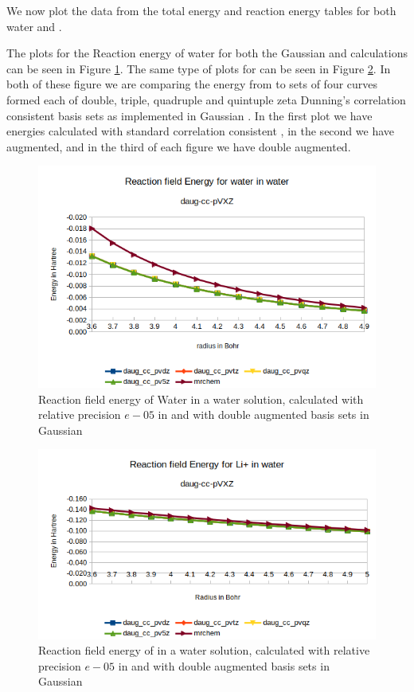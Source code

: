 \documentclass[../master_thesis.tex]{subfiles}
\begin{document}
We now plot the data from the total energy and reaction energy tables for
both water and .

The plots for the Reaction energy of water for
both the Gaussian and  \mrchem calculations can be seen in Figure \ref{fig:watEnergyplotsdaug}.
The same type of plots for  can be seen in Figure \ref{fig:lipEnergyplotsdaug}.
In both of these figure we are comparing the energy from \mrchem to sets of four
curves formed each of double, triple, quadruple and quintuple zeta Dunning's correlation
consistent \cite{doi:10.1063/1.456153} basis sets as implemented in Gaussian \cite{G09}.
In the first plot we have energies calculated with standard correlation consistent ,
in the second we have augmented, and in the third of each figure we have double augmented.


\begin{figure}[h!]
  \centering
    \includegraphics[width=\linewidth]{img/Erdaugwat.png}
  \caption{Reaction field energy of Water in a water solution, calculated with relative precision $e-05$ in \mrchem and with double augmented basis sets in Gaussian}
  \label{fig:watEnergyplotsdaug}
\end{figure}

\begin{figure}[h!]
  \centering
    \includegraphics[width=\linewidth]{img/Erdauglip.png}
  \caption{Reaction field energy of  in a water solution, calculated with relative precision $e-05$ in \mrchem  and with double augmented basis sets in Gaussian}
  \label{fig:lipEnergyplotsdaug}
\end{figure}
\end{document}
